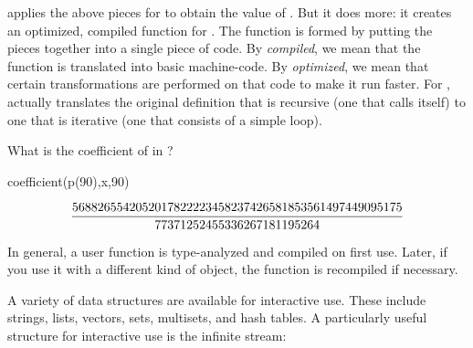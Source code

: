 \Language{} applies the above pieces for
 to obtain the value of .
But it does more:
it creates an optimized, compiled function for .
The function is formed by putting the pieces together into
a single piece of code.
By {\it compiled}, we mean that the function is translated into
basic machine-code.
By {\it optimized}, we mean that certain transformations are
performed on that code to make it run faster.
For , \Language{} actually translates the original definition
that is recursive (one that calls itself)
to one that is iterative (one that consists of a simple loop).

%
\begin{xtc}
\begin{xtccomment}
What is the coefficient of  in ?
\end{xtccomment}
\begin{spadsrc}
coefficient(p(90),x,90)
\end{spadsrc}
\begin{TeXOutput}
$$
\frac{56882655420520178222 23458237426581853561 497449095175}{%
77371252455336267181 195264}%
$$
\end{TeXOutput}
\end{xtc}

In general, a user function is type-analyzed and compiled on first use.
Later, if you use it with a different kind of object, the function
is recompiled if necessary.


A variety of data structures are available for interactive use.
These include strings, lists, vectors, sets, multisets, and hash
tables.
A particularly useful structure for interactive use is the
infinite stream:


